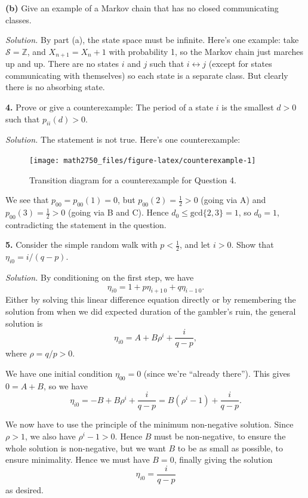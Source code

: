 \documentclass[
  a4paper,
]{article}
\theoremstyle{definition}
\theoremstyle{definition}
\theoremstyle{definition}
\theoremstyle{remark}
\begin{document}
\textbf{(b)} Give an example of a Markov chain that has no closed communicating classes.

\begin{myanswers}
\emph{Solution.} By part (a), the state space must be infinite. Here's one example: take \(\mathcal S = \mathbb Z\), and \(X_{n+1} = X_n + 1\) with probability 1, so the Markov chain just marches up and up. There are no states \(i\) and \(j\) such that \(i \leftrightarrow j\) (except for states communicating with themselves) so each state is a separate class. But clearly there is no absorbing state.

\end{myanswers}

\textbf{4.} Prove or give a counterexample: The period of a state \(i\) is the smallest \(d > 0\) such that \(p_{ii}(d) > 0\).

\begin{myanswers}
\emph{Solution.} The statement is not true. Here's one counterexample:

\begin{figure}

{\centering \texttt{[image: math2750\_files/figure-latex/counterexample-1]} 

}

\caption{Transition diagram for a counterexample for Question 4.}\label{fig:counterexample}
\end{figure}

We see that \(p_{00} = p_{00}(1) = 0\), but \(p_{00}(2) = \frac12 > 0\) (going via A) and \(p_{00}(3) = \frac12 > 0\) (going via B and C). Hence \(d_0 \leq \text{gcd}\{2,3\} = 1\), so \(d_0 = 1\), contradicting the statement in the question.

\end{myanswers}

\textbf{5.} Consider the simple random walk with \(p < \frac12\), and let \(i > 0\). Show that
\(\eta_{i0} = i/(q-p)\).

\begin{myanswers}
\emph{Solution.} By conditioning on the first step, we have
\[ \eta_{i0} = 1 + p\eta_{i+1\,0} + q\eta_{i-1\,0} . \]
Either by solving this linear difference equation directly or by remembering the solution from when we did expected duration of the gambler's ruin, the general solution is
\[ \eta_{i0} = A + B\rho^i + \frac{i}{q-p} , \]
where \(\rho = q/p > 0\).

We have one initial condition \(\eta_{00} = 0\) (since we're ``already there''). This gives \(0 = A + B\), so we have
\[ \eta_{i0} = -B + B\rho^i + \frac{i}{q-p} = B(\rho^i - 1) + \frac{i}{q-p} . \]

We now have to use the principle of the minimum non-negative solution. Since \(\rho > 1\), we also have \(\rho^i - 1 > 0\). Hence \(B\) must be non-negative, to ensure the whole solution is non-negative, but we want \(B\) to be as small as possible, to ensure minimality. Hence we must have \(B = 0\), finally giving the solution
\[ \eta_{i0} = \frac{i}{q-p} \]
as desired.

\end{myanswers}
\end{document}

